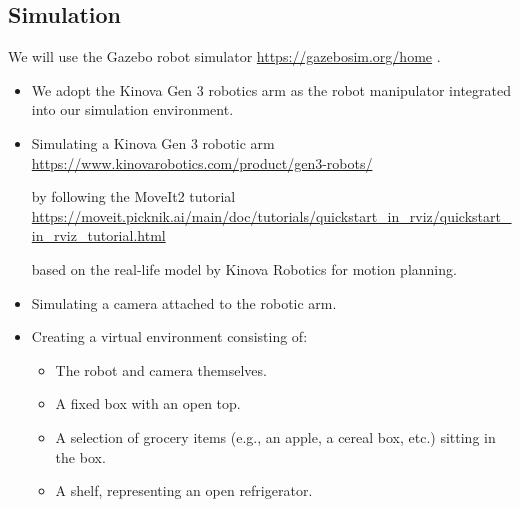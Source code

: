 \documentclass{article}
\begin{document}



\subsection{Simulation}
We will use the Gazebo robot simulator \url{https://gazebosim.org/home} \cite{1389727}. 
\begin{itemize}
    \item We adopt the Kinova Gen 3 robotics arm as the robot manipulator integrated into our simulation environment.
    \item Simulating a Kinova Gen 3 robotic arm \newline \url{https://www.kinovarobotics.com/product/gen3-robots/}
   
    by following the MoveIt2 tutorial 
    \newline
    \url{https://moveit.picknik.ai/main/doc/tutorials/quickstart_in_rviz/quickstart_in_rviz_tutorial.html}
   
    based on the real-life model by Kinova Robotics for motion planning.
    
    \item Simulating a camera attached to the robotic arm.
    \item Creating a virtual environment consisting of:
    \begin{itemize}
        \item The robot and camera themselves.
        \item A fixed box with an open top.
        \item A selection of grocery items (e.g., an apple, a cereal box, etc.) sitting in the box.
        \item A shelf, representing an open refrigerator.
    \end{itemize}
\end{itemize}
\end{document}
